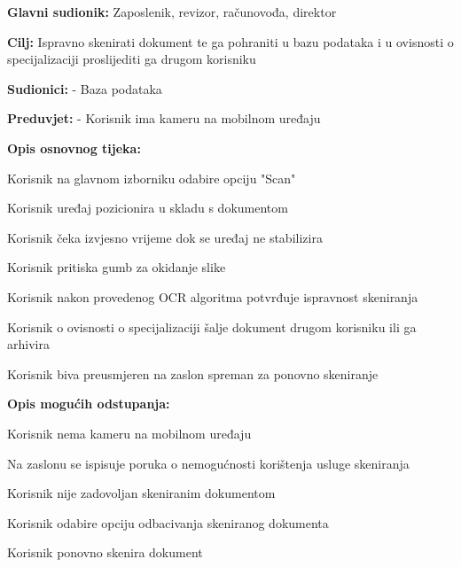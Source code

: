 					\noindent {}
						\begin{packed_item}
		
							\item \textbf{Glavni sudionik:} Zaposlenik, revizor, računovođa, direktor
							\item  \textbf{Cilj:} Ispravno skenirati dokument te ga pohraniti u bazu podataka i u ovisnosti o specijalizaciji proslijediti ga drugom korisniku
							\item  \textbf{Sudionici:} - Baza podataka
							\item  \textbf{Preduvjet:} - Korisnik ima kameru na mobilnom uređaju
							\item  \textbf{Opis osnovnog tijeka:}
							
							\item[] \begin{packed_enum}
								\item Korisnik na glavnom izborniku odabire opciju "Scan"
								\item Korisnik uređaj pozicionira u skladu s dokumentom
								\item Korisnik čeka izvjesno vrijeme dok se uređaj ne stabilizira
								\item Korisnik pritiska gumb za okidanje slike
								\item Korisnik nakon provedenog OCR algoritma potvrđuje ispravnost skeniranja
								\item Korisnik o ovisnosti o specijalizaciji šalje dokument drugom korisniku ili ga arhivira
								\item Korisnik biva preusmjeren na zaslon spreman za ponovno skeniranje
							\end{packed_enum}
							
							\item  \textbf{Opis mogućih odstupanja:}
							
							\item[] \begin{packed_item}
		
								\item[1.a]Korisnik nema kameru na mobilnom uređaju 
								\item[] \begin{packed_enum}
									\item Na zaslonu se ispisuje poruka o nemogućnosti korištenja usluge skeniranja
								\end{packed_enum}
								\item[6.a]Korisnik nije zadovoljan skeniranim dokumentom
								\item[] \begin{packed_enum}
									\item Korisnik odabire opciju odbacivanja skeniranog dokumenta
									\item Korisnik ponovno skenira dokument
								\end{packed_enum}
							\end{packed_item}
						\end{packed_item}

